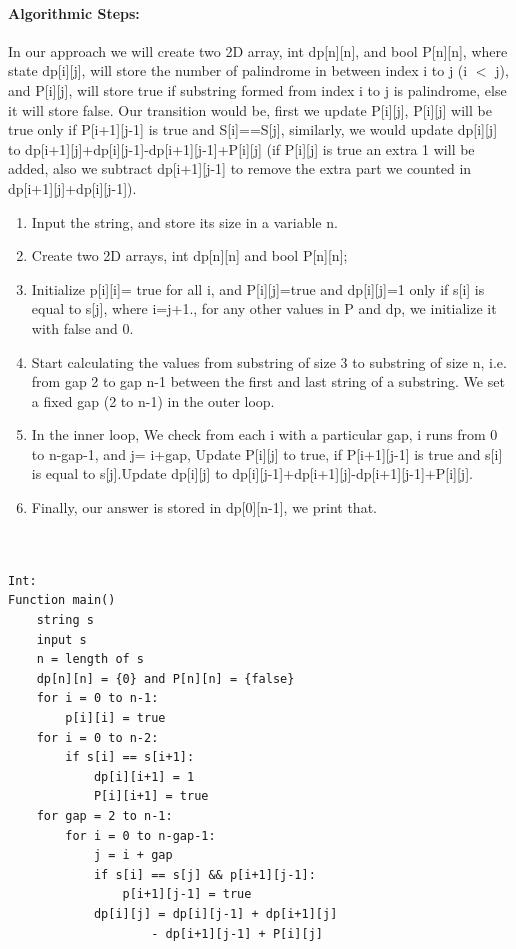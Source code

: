 \documentclass[10pt]{article}
\begin{document}
\begin{multicols*}{2}
\paragraph{Algorithmic Steps:}

In our approach we will create two 2D array, int dp[n][n], and bool P[n][n], where state dp[i][j], will store the number of palindrome in between index i to j (i $<$ j), and P[i][j], will store true if substring formed from index i to j is palindrome, else it will store false. Our transition would be, first we update P[i][j], P[i][j] will be true only if P[i+1][j-1] is true and S[i]==S[j], similarly, we would update dp[i][j] to dp[i+1][j]+dp[i][j-1]-dp[i+1][j-1]+P[i][j] (if P[i][j] is true an extra 1 will be added, also we subtract dp[i+1][j-1] to remove the extra part we counted in dp[i+1][j]+dp[i][j-1]).
\begin{enumerate}

\item	Input the string, and store its size in a variable n.
\item	Create two 2D arrays, int dp[n][n] and bool P[n][n];
\item   Initialize p[i][i]= true for all i, and P[i][j]=true and dp[i][j]=1 only if s[i] is equal to s[j], where i=j+1., for any other values in P and dp, we initialize it with false and 0.
\item	Start calculating the values from substring of size 3 to substring of size n, i.e. from gap 2 to gap n-1 between the first and last string of a substring. We set a fixed gap (2 to n-1) in the outer loop.
\item	In the inner loop, We check from each i with a particular gap, i runs from 0 to n-gap-1, and j= i+gap, Update P[i][j] to true, if P[i+1][j-1] is true and s[i] is equal to s[j].Update dp[i][j] to dp[i][j-1]+dp[i+1][j]-dp[i+1][j-1]+P[i][j].
\item	Finally, our answer is stored in dp[0][n-1], we print that.
\\\
\end{enumerate}


\begin{lstlisting}

Int:
Function main()
    string s
    input s
    n = length of s
    dp[n][n] = {0} and P[n][n] = {false}
    for i = 0 to n-1:
        p[i][i] = true
    for i = 0 to n-2:
        if s[i] == s[i+1]:
            dp[i][i+1] = 1
            P[i][i+1] = true
    for gap = 2 to n-1:
        for i = 0 to n-gap-1:
            j = i + gap
            if s[i] == s[j] && p[i+1][j-1]:
                p[i+1][j-1] = true
            dp[i][j] = dp[i][j-1] + dp[i+1][j]
                    - dp[i+1][j-1] + P[i][j]
    

\end{lstlisting}
\end{multicols*}
\end{document}
